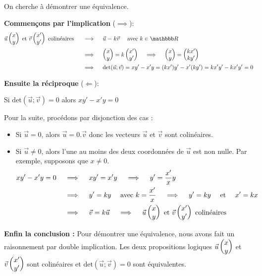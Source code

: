 \documentclass[10pt,a4paper,openany,twoside, prof]{book}
\begin{document}
\begin{deme}{}{}
	\begin{reponse}
	\noindent On cherche à démontrer une équivalence.

	\medskip
	\noindent \textbf{Commençons par l'implication} ($\implies$):
	\begin{align*}
		\vec{u}\coordvp{x}{y} \text{ et } \vec{v}\coordvp{x'}{y'} \text{ colinéaires } \quad & \implies \quad \vec{u}=k\vec{v} \quad \text{ avec } k \in \R                                                      \\
		                                                                                 & \implies \quad \coordvp{x}{y}=k\coordvp{x'}{y'} \quad \implies \quad \coordvp{x}{y}=\coordvp{kx'}{ky'} \\
		                                                                                 & \implies \quad \text{det}(\vec{u};\vec{v}) = xy'-x'y = (kx')y'-x'(ky') = kx'y'-kx'y' = 0
	\end{align*}

	\noindent \textbf{Ensuite la réciproque} ($\Longleftarrow$):

	Si $\text{det}(\vec{u};\vec{v})=0 $ alors $ xy'-x'y = 0 $

	\medskip
	Pour la suite, procédons par disjonction des cas :
	\begin{itemize}
		\item  Si $\vec{u} = 0$, alors $\vec{u} = 0.\vec{v}$ donc les vecteurs $\vec{u}$ et $\vec{v}$ sont colinéaires.
		\item  Si $\vec{u} \neq 0$, alors l'une au moins des deux coordonnées de $\vec{u}$ est non nulle. Par exemple, supposons que $x \neq 0$.
		      \begin{align*}
			      xy'-x'y = 0 \quad & \implies  \quad  xy' = x'y \quad \implies \quad  y' = \dfrac{x'}{x} y                                                            \\
			                        & \implies \quad y' = k y \quad \text{ avec } k = \dfrac{x'}{x} \quad \implies \quad  y' = k y \quad \text{ et } \quad x' = kx     \\
			                        & \implies \quad  \vec{v} = k \vec{u} \quad \implies \quad  \vec{u}\begin{pmatrix}x\\y\end{pmatrix} \text{ et } \vec{v}\begin{pmatrix}x'\\y'\end{pmatrix} \text{ colinéaires }
		      \end{align*}
	\end{itemize}

	\noindent \textbf{Enfin la conclusion :} Pour démontrer une équivalence, nous avons fait un raisonnement par double implication. Les deux propositions logiques \og $\vec{u}\begin{pmatrix}x\\y\end{pmatrix}$ et $\vec{v}\begin{pmatrix}x'\\y'\end{pmatrix}$ sont colinéaires \fg{}  et \og $\text{det}(\vec{u};\vec{v})=0$ \fg{}  sont équivalentes.
	\vspace{1.5cm}
\end{reponse}
\end{deme}
\end{document}
